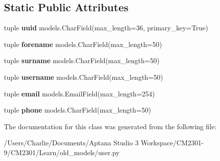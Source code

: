 \subsection*{Static Public Attributes}
\begin{DoxyCompactItemize}
\item 
\hypertarget{class_learn_1_1old__models_1_1user_1_1_user_af60e13d947e49d668e7d9af32a9f095a}{tuple {\bfseries uuid} models.\-Char\-Field(max\-\_\-length=36, primary\-\_\-key=True)}\label{class_learn_1_1old__models_1_1user_1_1_user_af60e13d947e49d668e7d9af32a9f095a}

\item 
\hypertarget{class_learn_1_1old__models_1_1user_1_1_user_aa2c2f61f85073496e09612cd4c2abd2e}{tuple {\bfseries forename} models.\-Char\-Field(max\-\_\-length=50)}\label{class_learn_1_1old__models_1_1user_1_1_user_aa2c2f61f85073496e09612cd4c2abd2e}

\item 
\hypertarget{class_learn_1_1old__models_1_1user_1_1_user_a713f9b733aa97b1364415126b8f789a9}{tuple {\bfseries surname} models.\-Char\-Field(max\-\_\-length=50)}\label{class_learn_1_1old__models_1_1user_1_1_user_a713f9b733aa97b1364415126b8f789a9}

\item 
\hypertarget{class_learn_1_1old__models_1_1user_1_1_user_af452b5a8caef5df2d87e4c8c7f79ada0}{tuple {\bfseries username} models.\-Char\-Field(max\-\_\-length=50)}\label{class_learn_1_1old__models_1_1user_1_1_user_af452b5a8caef5df2d87e4c8c7f79ada0}

\item 
\hypertarget{class_learn_1_1old__models_1_1user_1_1_user_af6ecd12012d2cae25ada38bb93f3eb1d}{tuple {\bfseries email} models.\-Email\-Field(max\-\_\-length=254)}\label{class_learn_1_1old__models_1_1user_1_1_user_af6ecd12012d2cae25ada38bb93f3eb1d}

\item 
\hypertarget{class_learn_1_1old__models_1_1user_1_1_user_a70a55469415a167614974bdb85b0f0c9}{tuple {\bfseries phone} models.\-Char\-Field(max\-\_\-length=50)}\label{class_learn_1_1old__models_1_1user_1_1_user_a70a55469415a167614974bdb85b0f0c9}

\end{DoxyCompactItemize}


The documentation for this class was generated from the following file\-:\begin{DoxyCompactItemize}
\item 
/\-Users/\-Charlie/\-Documents/\-Aptana Studio 3 Workspace/\-C\-M2301-\/9/\-C\-M2301/\-Learn/old\-\_\-models/user.\-py\end{DoxyCompactItemize}
